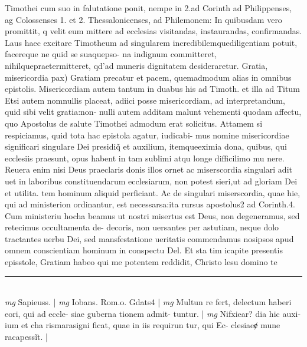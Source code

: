 \documentclass{article}
\begin{document}
\begin{pages}
Timothei cum suo in falutatione ponit, nempe in 2.ad Corinth ad Philippenses, ag Colossenses 1. et 2. Thessalonicenses, ad Philemonem: In quibusdam vero promittit, q velit eum mittere ad ecclesias visitandas, instaurandas, confirmandas. Laus haec excitare Timotheum ad singularem incredibilemquediligentiam potuit, facereque  ne quid se suaquepso- na indignum committeret, nihilquepraetermitteret, qd'ad muneris dignitatem desideraretur.  \pend\pstart Gratia, misericordia pax) Gratiam precatur et pacem, quemadmodum alias in omnibus epistolis. Misericordiam autem tantum in duabus his ad Timoth. et illa ad Titum Etsi autem nomnullis placeat, adiici posse misericordiam, ad interpretandum, quid sibi velit gratia:non- nulli autem additam malunt vehementi quodam affectu, quo Apostolus de salute Timothei admodum erat solicitus. Attamem si respiciamus, quid tota hac epistola agatur, iudicabi- mus nomine misericordiae significari singulare Dei presidiq̃ et auxilium, itemqueeximia dona, quibus, qui ecclesiis praesunt, opus habent in tam sublimi atqu longe difficilimo mu nere. Reuera enim nisi Deus praeclaris donis illos ornet ac miserscordia singulari adit uet in laboribus constituendarum ecclesiarum, non potest sieri,ut ad gloriam Dei et utilita. tem hominum aliquid perficiant. Ac de singulari miserscordia, quae hie, qui ad ministerion ordinantur, est necessarsa:ita rursus apostolus2 ad Corinth.4. Cum ministeriu hocha beamus ut nostri misertus est Deus, non degeneramus, sed retecimus occultamenta de- decoris, non uersantes per astutiam, neque  dolo tractantes uerbu Dei, sed mansfestatione ueritatis commendamus nosipsos apud omnem conscientiam hominum in conspectu Del. Et sta  tim icapite presentis episstole, Gratiam habeo qui me potentem reddidit, Christo lesu domino te  \pend
\vspace{0.5cm}\noindent
\vspace{0.2cm}\rule{1cm}{0.2pt}\\ 
\hspace{0.2cm}\textit{mg}
\footnotesize Sapieuss. 
\normalsize| 
\hspace{0.2cm}\textit{mg}
\footnotesize Iobans. Rom.o. Gdats4 
\normalsize| 
\hspace{0.2cm}\textit{mg}
\footnotesize Multun re fert, delectum haberi eori, qui ad eccle- siae guberna tionem admit- tuntur. 
\normalsize| 
\hspace{0.2cm}\textit{mg}
\footnotesize Nifxiear? dia hic auxi- ium et cha rismarasigni ficat, quae in iis requirun tur, qui Ec- clesiaeɇ mune racapessĩt. 
\normalsize| 

\end{pages}
\end{document}
